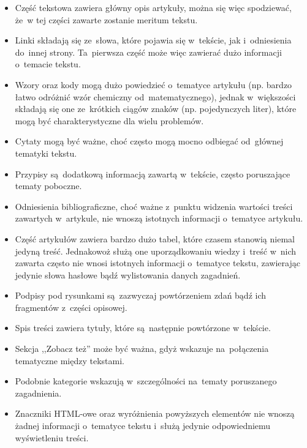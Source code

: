 \documentclass{praca1}
\begin{document}
\begin{itemize}
\item Część tekstowa zawiera główny opis artykuły, można się więc spodziewać, że~w tej części zawarte zostanie meritum tekstu.
\item Linki składają się ze~słowa, które pojawia się w~tekście, jak i~odniesienia do~innej strony. Ta~pierwsza część może więc zawierać dużo informacji o~temacie tekstu.
\item Wzory oraz kody mogą dużo powiedzieć o~tematyce artykułu (np. bardzo łatwo odróżnić wzór chemiczny od~matematycznego), jednak w~większości składają się one ze~krótkich ciągów znaków (np. pojedynczych liter), które mogą być charakterystyczne dla wielu problemów.
\item Cytaty mogą być ważne, choć często mogą mocno odbiegać od~głównej tematyki tekstu.
\item Przypisy są~dodatkową informacją zawartą w~tekście, często poruszające tematy poboczne.
\item Odniesienia bibliograficzne, choć ważne z~punktu widzenia wartości treści zawartych w~artykule, nie wnoszą istotnych informacji o~tematyce artykułu.
\item Część artykułów zawiera bardzo dużo tabel, które czasem stanowią niemal jedyną treść. Jednakowoż służą one uporządkowaniu wiedzy i~treść w~nich zawarta często nie wnosi istotnych informacji o~tematyce tekstu, zawierając jedynie słowa hasłowe bądź wylistowania danych zagadnień.
\item Podpisy pod rysunkami są~zazwyczaj powtórzeniem zdań bądź ich fragmentów z~części opisowej.
\item Spis treści zawiera tytuły, które są~następnie powtórzone w~tekście.
\item Sekcja ,,Zobacz też'' może być ważna, gdyż wskazuje na~połączenia tematyczne między tekstami.
\item Podobnie kategorie wskazują w~szczególności na~tematy poruszanego zagadnienia.
\item Znaczniki HTML-owe oraz wyróżnienia powyższych elementów nie wnoszą żadnej informacji o~tematyce tekstu i~służą jedynie odpowiedniemu wyświetleniu treści.
\end{itemize}
\end{document}
